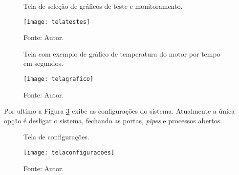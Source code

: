 \begin{figure}[!htb]
	\centering
		\caption{Tela de seleção de gráficos de teste e monitoramento.}
		\texttt{[image: telatestes]} 
		\caption*{Fonte: Autor.}
		\label{fig:telatestes}
\end{figure}    

\begin{figure}[!htb]
	\centering
		\caption{Tela com exemplo de gráfico de temperatura do motor por tempo em segundos.}
		\texttt{[image: telagrafico]} 
		\caption*{Fonte: Autor.}
		\label{fig:telagrafico}
\end{figure}    

Por ultimo a Figura \ref{fig:telaconfiguracao} exibe as configurações do sistema. Atualmente a única opção é desligar o sistema, fechando as portas, \textit{pipes} e processos abertos. 


\begin{figure}[!htb]
	\centering
		\caption{Tela de configurações.}
		\texttt{[image: telaconfiguracoes]} 
		\caption*{Fonte: Autor.}
		\label{fig:telaconfiguracao}
\end{figure}    
